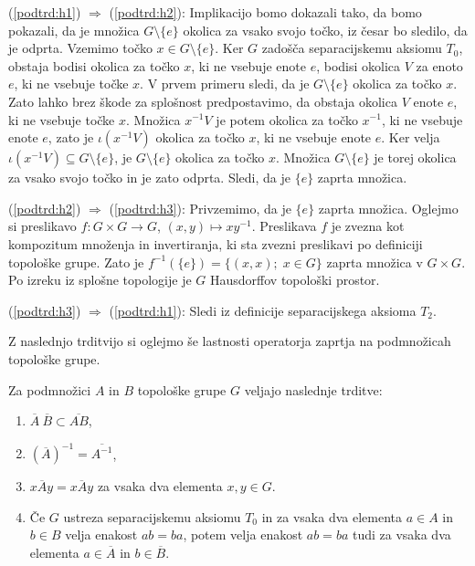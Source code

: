 \documentclass[mat1]{fmfdelo}
\newcommand{\closure}[1]{\overline{#1}}
\begin{document}
\begin{dokaz}
	(\ref{podtrd:h1}) $\Rightarrow$ (\ref{podtrd:h2}):
	Implikacijo bomo dokazali tako, da bomo pokazali, da je množica $G\setminus\lbrace e \rbrace$ okolica za vsako svojo točko, iz česar bo sledilo, da je odprta.
	Vzemimo točko $x \in G\setminus\lbrace e \rbrace$. Ker $G$ zadošča separacijskemu aksiomu $T_0$, obstaja bodisi okolica za točko $x$, ki ne vsebuje enote $e$, bodisi okolica $V$ za enoto $e$, ki ne vsebuje točke $x$. V prvem primeru sledi, da je $G\setminus\lbrace e \rbrace$ okolica za točko $x$.
	Zato lahko brez škode za splošnost predpostavimo, da obstaja okolica $V$ enote $e$, ki ne vsebuje točke $x$. Množica $x^{-1}V$ je potem okolica za točko $x^{-1}$, ki ne vsebuje enote $e$, zato je $\iota(x^{-1}V)$ okolica za točko $x$, ki ne vsebuje enote $e$. Ker velja $\iota(x^{-1}V) \subseteq G \setminus \lbrace e \rbrace$, je $G\setminus\lbrace e \rbrace$ okolica za točko $x$.
	Množica $G\setminus\lbrace e \rbrace$ je torej okolica za vsako svojo točko in je zato odprta. Sledi, da je $\lbrace e \rbrace$ zaprta množica.
	
	
	(\ref{podtrd:h2}) $\Rightarrow$ (\ref{podtrd:h3}):
	Privzemimo, da je $\lbrace e \rbrace$ zaprta množica. Oglejmo si preslikavo $f\colon G \times G \to G$, $(x, y) \mapsto xy^{-1}$. Preslikava $f$ je zvezna kot kompozitum množenja in invertiranja, ki sta zvezni preslikavi po definiciji topološke grupe. Zato je $f^{-1}(\lbrace e \rbrace) = \lbrace (x, x) ;\; x \in G \rbrace$ zaprta množica v $G \times G$. Po izreku iz splošne topologije je $G$ Hausdorffov topološki prostor.
	
	(\ref{podtrd:h3}) $\Rightarrow$ (\ref{podtrd:h1}):
	Sledi iz definicije separacijskega aksioma $T_2$.
\end{dokaz}

Z naslednjo trditvijo si oglejmo še lastnosti operatorja zaprtja na podmnožicah topološke grupe.
\begin{trditev}\label{trd:zaprtost}
	Za podmnožici $A$ in $B$ topološke grupe $G$ veljajo naslednje trditve:
	\begin{enumerate}
		\item $\closure{A}\ \closure{B} \subset \closure{A B}$,\label{podtrd:zap1}
		\item $(\closure{A})^{-1} = \closure{A^{-1}}$,\label{podtrd:zap2}
		\item $x \closure{A} y = \closure{x A y}$ za vsaka dva elementa $x, y \in G$.\label{podtrd:zap3}
		
		\item Če $G$ ustreza separacijskemu aksiomu $T_0$ in za vsaka dva elementa $a \in A$ in $b \in B$ velja enakost $ab = ba$, potem velja enakost $ab = ba$ tudi za vsaka dva elementa $a \in \closure{A}$ in $b \in \closure{B}$.\label{podtrd:zap4}
	\end{enumerate}
\end{trditev}
\end{document}
